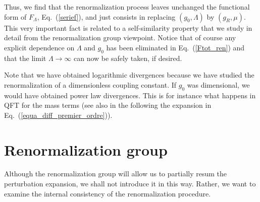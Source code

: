 \documentclass[floatfix,twocolumn,preprintnumbers,amsmath,amssymb,prb]{revtex4}
\begin{document}
Thus, we find that the renormalization process leaves unchanged
the functional form of $F_{\Lambda}$, Eq.~(\ref{serief}), and just consists in replacing
$(g_0,\Lambda)$ by $(g_R,\mu)$. This very important fact is
related to a self-similarity property that we study in detail from
the renormalization group viewpoint. Notice that of course any
explicit dependence on $\Lambda$ and $g_0$ has been eliminated in
Eq.~(\ref{Ftot_ren}) and that the limit $\Lambda\to\infty$ can now
be safely taken, if desired.

Note that we have obtained logarithmic divergences because we have
studied the renormalization of a dimensionless coupling constant.
If $g_0$ was dimensional, we would have obtained power law
divergences. This is for instance what happens in QFT for the mass
terms (see also in the following the expansion in
Eq.~(\ref{equa_diff_premier_ordre})).

\section{Renormalization group}
Although the renormalization group will allow us to partially
resum the perturbation expansion, we shall not introduce it in
this way. Rather, we want to examine the internal consistency of
the renormalization procedure.
\end{document}
